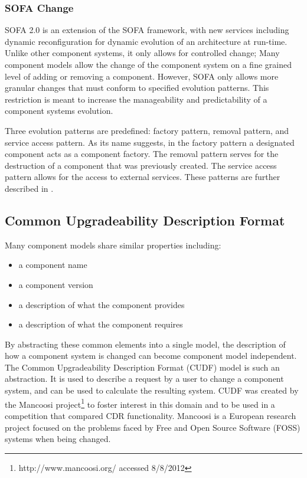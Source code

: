 \subsubsection{SOFA Change}
SOFA 2.0 is an extension of the SOFA framework, with new services including dynamic reconfiguration for dynamic evolution of an architecture at run-time. 
Unlike other component systems,
it only allows for controlled change; 
Many component models allow the change of the component system on a fine grained level of adding or removing a component.
However, SOFA only allows more granular changes that must conform to specified evolution patterns.
This restriction is meant to increase the manageability and predictability of a component systems evolution. 

Three evolution patterns are predefined: factory pattern, removal pattern, and service access pattern.
As its name suggests, in the factory pattern a designated component acts as a component factory. 
The removal pattern serves for the destruction of a component that was previously created.
The service access pattern allows for the access to external services.
These patterns are further described in \citep{Hnetynka2006}.


\subsection{Common Upgradeability Description Format}
Many component models share similar properties including:
\begin{itemize}
  \item a component name
  \item a component version
  \item a description of what the component provides
  \item a description of what the component requires
\end{itemize} 

By abstracting these common elements into a single model, the description of how a component system is changed can become component model independent.
The Common Upgradeability Description Format (CUDF) model is such an abstraction.
It is used to describe a request by a user to change a component system, and can be used to calculate the resulting system.
CUDF was created by the Mancoosi project\footnote{http://www.mancoosi.org/ accessed 8/8/2012} to foster interest in this domain and to be used in a competition that compared CDR functionality.
Mancoosi is a European research project focused on the problems faced by Free and Open Source Software (FOSS) systems when being changed.

